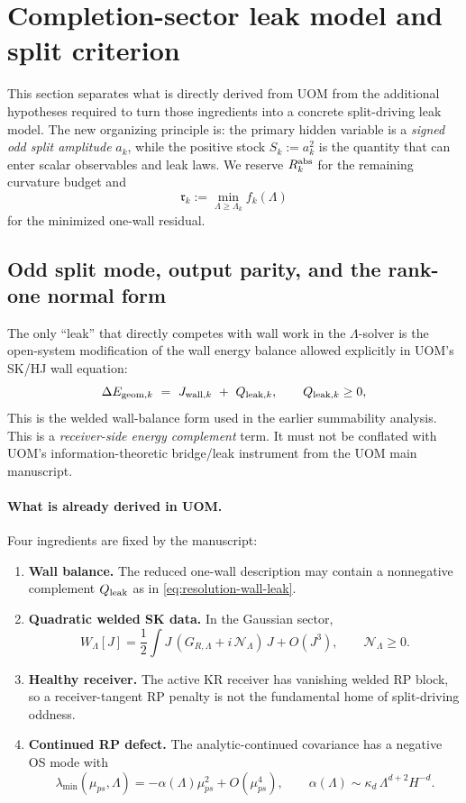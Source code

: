 \section{Completion-sector leak model and split criterion}
\label{sec:resolution}

This section separates what is directly derived from UOM from the additional hypotheses required to turn those ingredients
into a concrete split-driving leak model. The new organizing principle is:
the primary hidden variable is a \emph{signed odd split amplitude} \(a_k\), while the positive stock
\(S_k:=a_k^2\) is the quantity that can enter scalar observables and leak laws.
We reserve \(R_k^{\rm abs}\) for the remaining curvature budget and
\[
\mathfrak r_k:=\min_{\Lambda\ge \Lambda_k} f_k(\Lambda)
\]
for the minimized one-wall residual.

\subsection{Odd split mode, output parity, and the rank-one normal form}
\label{subsec:leak-solution}

The only ``leak'' that directly competes with wall work in the \(\Lambda\)-solver is the open-system modification of the
wall energy balance allowed explicitly in UOM's SK/HJ wall equation:
\begin{equation}
\Delta E_{{\rm geom},k}\ =\ J_{{\rm wall},k}\ +\ Q_{{\rm leak},k},
\qquad Q_{{\rm leak},k}\ge 0,
\label{eq:resolution-wall-leak}
\end{equation}
This is the welded wall-balance form used in the earlier summability analysis.
This is a \emph{receiver-side energy complement} term. It must not be conflated with UOM's information-theoretic
bridge/leak instrument from the UOM main manuscript.

\paragraph{What is already derived in UOM.}
Four ingredients are fixed by the manuscript:
\begin{enumerate}[leftmargin=2em]
\item \textbf{Wall balance.} The reduced one-wall description may contain a nonnegative complement \(Q_{\rm leak}\) as in
\eqref{eq:resolution-wall-leak}.
\item \textbf{Quadratic welded SK data.} In the Gaussian sector,
\[
W_\Lambda[J]=\frac12\int J\,(G_{R,\Lambda}+i\,\mathcal N_\Lambda)\,J+O(J^3),
\qquad \mathcal N_\Lambda\ge 0.
\]
\item \textbf{Healthy receiver.} The active KR receiver has vanishing welded RP block, so a receiver-tangent RP penalty is
not the fundamental home of split-driving oddness.
\item \textbf{Continued RP defect.} The analytic-continued covariance has a negative OS mode with
\[
\lambda_{\min}(\mu_{ps},\Lambda)
=
-\alpha(\Lambda)\mu_{ps}^2+O(\mu_{ps}^4),
\qquad
\alpha(\Lambda)\sim \kappa_d\,\Lambda^{d+2}H^{-d}.
\]
\end{enumerate}

